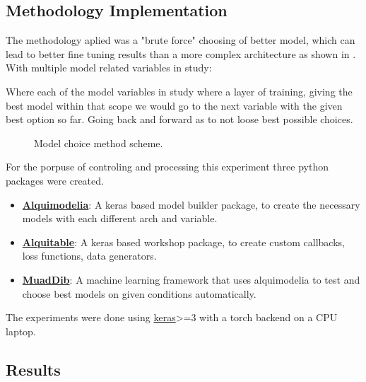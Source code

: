   


\subsection{Methodology Implementation}

The methodology aplied was a "brute force" choosing of better model, which can lead to better fine tuning results than a more complex architecture as shown in \cite{Liu2022}. With multiple model related variables in study:\par



Where each of the model variables in study where a layer of training, giving the best model within that scope we would go to the next variable with the given best option so far. Going back and forward as to not loose best possible choices.\par


\begin{figure}[H]
	\centering
	\resizebox{\linewidth}{!}{}
	\caption{Model choice method scheme.}
	\label{fig:method_training}
\end{figure}

For the porpuse of controling and processing this experiment three python packages were created.

\begin{itemize}
    \item \textbf{\href{https://github.com/alquimodelia/alquimodelia}{Alquimodelia}}: A keras based model builder package, to create the necessary models with each different arch and variable.
    \item \textbf{\href{https://github.com/alquimodelia/alquitable}{Alquitable}}: A keras based workshop package, to create custom callbacks, loss functions, data generators.
    \item \textbf{\href{https://github.com/alquimodelia/MuadDib}{MuadDib}}: A machine learning framework that uses alquimodelia to test and choose best models on given conditions automatically.
\end{itemize}

The experiments were done using \href{https://keras.io/}{keras}>=3 with a torch backend on a CPU laptop.

\subsection{Results}

